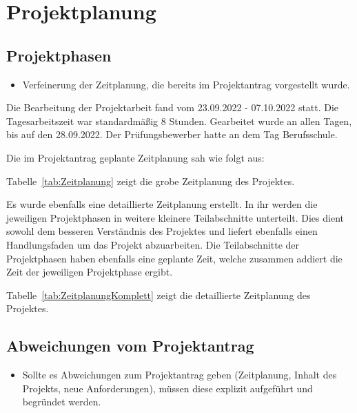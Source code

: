 \section{Projektplanung} 
\label{sec:Projektplanung}


\subsection{Projektphasen}
\label{sec:Projektphasen}

\begin{itemize}
	\item Verfeinerung der Zeitplanung, die bereits im Projektantrag vorgestellt wurde.
\end{itemize}

Die Bearbeitung der Projektarbeit fand vom 23.09.2022 - 07.10.2022 statt. Die Tagesarbeitszeit war standardmäßig 8 Stunden. Gearbeitet wurde an allen Tagen, bis auf den 28.09.2022. Der Prüfungsbewerber hatte an dem Tag Berufsschule. 

Die im Projektantrag geplante Zeitplanung sah wie folgt aus:

\newpage

Tabelle~\ref{tab:Zeitplanung} zeigt die grobe Zeitplanung des Projektes.

Es wurde ebenfalls eine detaillierte Zeitplanung erstellt. In ihr werden die jeweiligen Projektphasen in weitere kleinere Teilabschnitte unterteilt. Dies dient sowohl dem besseren Verständnis des Projektes und liefert ebenfalls einen Handlungsfaden um das Projekt abzuarbeiten. Die Teilabschnitte der Projektphasen haben ebenfalls eine geplante Zeit, welche zusammen addiert die Zeit der jeweiligen Projektphase ergibt.

\newpage

Tabelle~\ref{tab:ZeitplanungKomplett} zeigt die detaillierte Zeitplanung des Projektes.

\newpage

\subsection{Abweichungen vom Projektantrag}
\label{sec:AbweichungenProjektantrag}

\begin{itemize}
	\item Sollte es Abweichungen zum Projektantrag geben (\zB Zeitplanung, Inhalt des Projekts, neue Anforderungen), müssen diese explizit aufgeführt und begründet werden.
\end{itemize}


